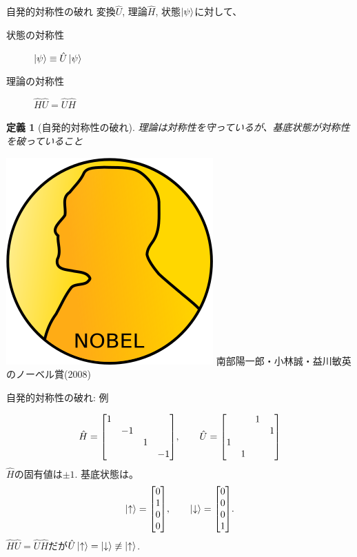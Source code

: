 \documentclass[dvipdfm]{beamer}
\newtheorem*{defn}{定義}
\begin{document}
\begin{frame}{自発的対称性の破れ}
    変換$\hat{U}$, 理論$\hat{H}$, 状態$\ket{\mathrm{\psi}}$に対して、
    \begin{description}
        \item[状態の対称性] $\ket{\psi}\equiv\hat{U}\ket{\psi}$
        \item[理論の対称性] $\hat{H}\hat{U}=\hat{U}\hat{H}$
    \end{description}
    \begin{defn}[自発的対称性の破れ]
        理論は対称性を守っているが、基底状態が対称性を破っていること
    \end{defn}
    \includegraphics[width=0.1\linewidth]{Nobel_prize_medal.svg.png}
    南部陽一郎・小林誠・益川敏英のノーベル賞(2008)
\end{frame}

\begin{frame}{自発的対称性の破れ: 例}
    \begin{example}
        \begin{equation*}
            \hat{H}
            =
            \mqty[\dmat{1,-1,1,-1}],
            \qquad
            \hat{U}
            =
            \mqty[ & & 1 & \\ & & & 1 \\ 1 & & & \\ & 1 & & ]
        \end{equation*}
        $\hat{H}$の固有値は$\pm1$.
        基底状態は。
        \begin{equation*}
            \ket{\uparrow}
            =
            \mqty[0 \\ 1 \\ 0 \\ 0],
            \qquad
            \ket{\downarrow}
            =
            \mqty[0 \\ 0 \\ 0 \\ 1].
        \end{equation*}
        $\hat{H}\hat{U}=\hat{U}\hat{H}$だが$\hat{U}\ket{\uparrow}=\ket{\downarrow}\not\equiv\ket{\uparrow}$.
        \textbf{}
    \end{example}
\end{frame}
\end{document}
